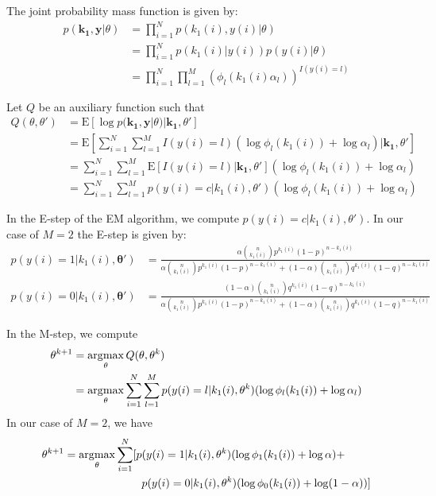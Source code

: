 The joint probability mass function is given by:
\begin{align*}
p(\mathbf{k_1}, \mathbf{y} | \theta ) &= \prod_{i=1}^{N} p(k_1(i), y(i) | \theta ) \\
&= \prod_{i=1}^{N} p(k_1(i) | y(i) ) p(y(i) | \theta )  \\
&= \prod_{i=1}^{N} \prod_{l=1}^{M} (\phi_l(k_1(i) \alpha_l)) ^ {I(y(i)=l)}
\end{align*}

Let $Q$ be an auxiliary function such that
\begin{align*}
Q(\theta, \theta') &= \mathrm{E} \left[ \log p(\mathbf{k_1}, \mathbf{y} | \theta ) | \mathbf{k_1}, \theta' \right] \\
&= \mathrm{E} \left[ \sum_{i=1}^{N} \sum_{l=1}^{M} I(y(i)=l) (\log \phi_l(k_1(i)) + \log \alpha_l) | \mathbf{k_1}, \theta' \right] \\
&= \sum_{i=1}^{N} \sum_{l=1}^{M} \mathrm{E} \left[ I(y(i)=l) | \mathbf{k_1}, \theta' \right] (\log \phi_l(k_1(i)) + \log \alpha_l)  \\
&= \sum_{i=1}^{N} \sum_{l=1}^{M} p(y(i) = c | k_1(i), \theta') (\log \phi_l(k_1(i)) + \log \alpha_l)
\end{align*}

In the E-step of the EM algorithm, we compute $p(y(i) = c | k_1(i), \theta')$. 
In our case of $M=2$ the E-step is given by:
\begin{align*}
p(y(i) = 1 | k_1(i), \mathbf{\theta'}) &= \frac{\alpha \binom{n}{k_1(i)} p^{k_1(i)} (1-p)^{n-k_1(i)}}{\alpha \binom{n}{k_1(i)} p^{k_1(i)} (1-p)^{n-k_1(i)} + (1-\alpha) \binom{n}{k_1(i)} q^{k_1(i)} (1-q)^{n-k_1(i)}} \\
p(y(i) = 0 | k_1(i), \mathbf{\theta'}) &= \frac{(1-\alpha) \binom{n}{k_1(i)} q^{k_1(i)} (1-q)^{n-k_1(i)}}{\alpha \binom{n}{k_1(i)} p^{k_1(i)} (1-p)^{n-k_1(i)} + (1-\alpha) \binom{n}{k_1(i)} q^{k_1(i)} (1-q)^{n-k_1(i)}}
\end{align*}

In the M-step, we compute
\begin{align*}
\theta^{k+1} &= \operatorname*{\arg\!\max}_\theta Q(\theta, \theta^{k}) \\
&= \operatorname*{\arg\!\max}_\theta \sum_{i=1}^{N} \sum_{l=1}^{M} p(y(i) = l | k_1(i), \theta^{k}) (\log \phi_l(k_1(i)) + \log \alpha_l)
\end{align*}
In our case of $M=2$, we have
\begin{align*}
\theta^{k+1} &= \operatorname*{\arg\!\max}_\theta \sum_{i=1}^{N} [ p(y(i) = 1 | k_1(i), \theta^{k}) (\log \phi_1(k_1(i)) + \log \alpha) + \\
& \quad \quad \quad \quad \quad \quad \quad p(y(i) = 0 | k_1(i), \theta^{k}) (\log \phi_0(k_1(i)) + \log (1-\alpha)) ]
\end{align*}

